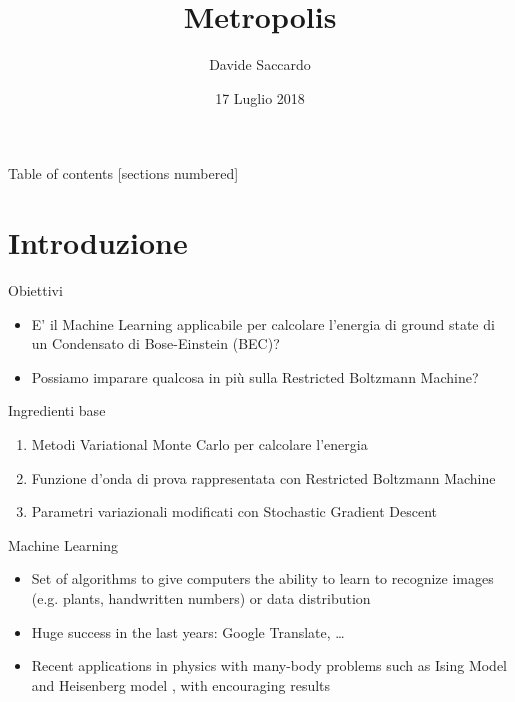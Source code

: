 \documentclass[10pt]{beamer}
\title{Metropolis}
\date{17 Luglio 2018}
\author{Davide Saccardo}
\institute{Università di Trento}
\begin{document}
\maketitle

\begin{frame}{Table of contents}
  [sections numbered]
  \tableofcontents[hideallsubsections]
\end{frame}

\section{Introduzione}

\begin{frame}[fragile]{Obiettivi}
\begin{itemize}
	\item E' il Machine Learning applicabile per calcolare l'energia di ground state di un Condensato di Bose-Einstein (BEC)?
	\item Possiamo imparare qualcosa in più sulla Restricted Boltzmann Machine?
\end{itemize}

\end{frame}

\begin{frame}[fragile]{Ingredienti base}
	\begin{enumerate}
			\item Metodi Variational Monte Carlo per calcolare l'energia
			\item Funzione d'onda di prova rappresentata con Restricted Boltzmann Machine
			\item Parametri variazionali modificati con Stochastic Gradient Descent
	\end{enumerate}
\end{frame}

\begin{frame}[fragile]{Machine Learning}
	\begin{itemize}
		\item Set of algorithms to give computers the ability to learn to recognize images (e.g. plants, handwritten numbers) or data distribution
		\item Huge success in the last years: Google Translate, \dots
		\item Recent applications in physics with many-body problems such as Ising Model and Heisenberg model , with encouraging results
	\end{itemize}
\end{frame}
\end{document}
